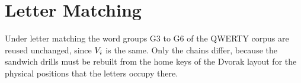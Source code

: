 \section{Letter Matching}

Under letter matching the word groups G3 to G6 of the QWERTY corpus are reused unchanged, since $V_i$ is the same. Only the chains differ, because the sandwich drills must be rebuilt from the home keys of the Dvorak layout for the physical positions that the letters occupy there.
